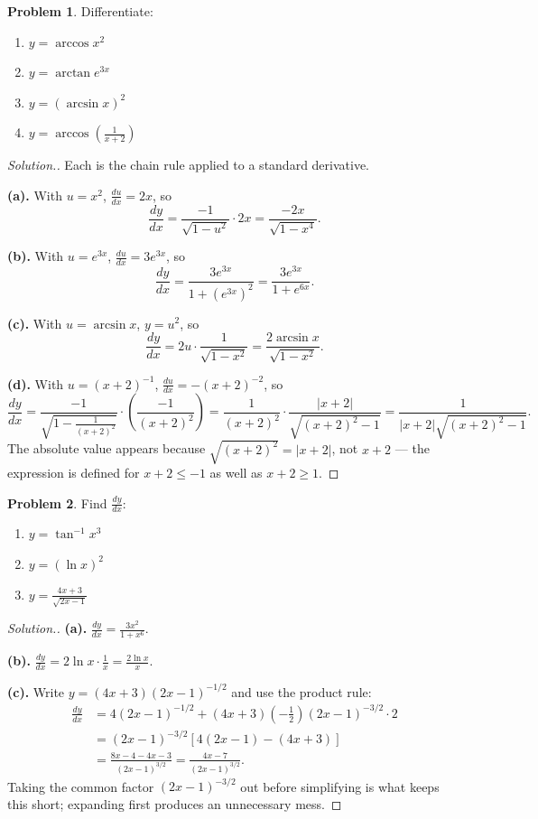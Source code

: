 \documentclass[11pt,a4paper]{article}
\theoremstyle{definition}
\newtheorem{problemx}{Problem}[section]
\newenvironment{problem}{\begin{problemx}}{\end{problemx}}
\newenvironment{solution}
  {\renewcommand{\qedsymbol}{}\begin{proof}[\textit{Solution}.]}
  {\end{proof}}
\begin{document}
\begin{problem}
Differentiate:
\begin{enumerate}
\item[(a).] $y=\arccos x^{2}$
\item[(b).] $y=\arctan e^{3x}$
\item[(c).] $y=(\arcsin x)^{2}$
\item[(d).] $y=\arccos\left(\frac{1}{x+2}\right)$
\end{enumerate}
\end{problem}

\begin{solution}
Each is the chain rule applied to a standard derivative.

\textbf{(a).} With $u=x^{2}$, $\frac{du}{dx}=2x$, so
$$\frac{dy}{dx}=\frac{-1}{\sqrt{1-u^{2}}}\cdot 2x
=\frac{-2x}{\sqrt{1-x^{4}}} .$$

\textbf{(b).} With $u=e^{3x}$, $\frac{du}{dx}=3e^{3x}$, so
$$\frac{dy}{dx}=\frac{3e^{3x}}{1+\left(e^{3x}\right)^{2}}
=\frac{3e^{3x}}{1+e^{6x}} .$$

\textbf{(c).} With $u=\arcsin x$, $y=u^{2}$, so
$$\frac{dy}{dx}=2u\cdot\frac{1}{\sqrt{1-x^{2}}}
=\frac{2\arcsin x}{\sqrt{1-x^{2}}} .$$

\textbf{(d).} With $u=(x+2)^{-1}$, $\frac{du}{dx}=-(x+2)^{-2}$, so
$$\frac{dy}{dx}=\frac{-1}{\sqrt{1-\frac{1}{(x+2)^{2}}}}\cdot
\left(\frac{-1}{(x+2)^{2}}\right)
=\frac{1}{(x+2)^{2}}\cdot\frac{\left|x+2\right|}{\sqrt{(x+2)^{2}-1}}
=\frac{1}{\left|x+2\right|\sqrt{(x+2)^{2}-1}} .$$
The absolute value appears because
$\sqrt{(x+2)^{2}}=\left|x+2\right|$, not $x+2$ --- the expression is defined for
$x+2\leq-1$ as well as $x+2\geq 1$.
\end{solution}

\begin{problem}
Find $\frac{dy}{dx}$:
\begin{enumerate}
\item[(a).] $y=\tan^{-1}x^{3}$
\item[(b).] $y=\left(\ln x\right)^{2}$
\item[(c).] $y=\frac{4x+3}{\sqrt{2x-1}}$
\end{enumerate}
\end{problem}

\begin{solution}
\textbf{(a).} $\frac{dy}{dx}=\frac{3x^{2}}{1+x^{6}}$.

\textbf{(b).} $\frac{dy}{dx}=2\ln x\cdot\frac{1}{x}=\frac{2\ln x}{x}$.

\textbf{(c).} Write $y=(4x+3)(2x-1)^{-1/2}$ and use the product rule:
\begin{align*}
\frac{dy}{dx} &=4(2x-1)^{-1/2}+(4x+3)\left(-\tfrac{1}{2}\right)(2x-1)^{-3/2}\cdot 2\\
               &=(2x-1)^{-3/2}\left[4(2x-1)-(4x+3)\right]\\
               &=\frac{8x-4-4x-3}{(2x-1)^{3/2}}
                =\frac{4x-7}{(2x-1)^{3/2}} .
\end{align*}
Taking the common factor $(2x-1)^{-3/2}$ out before simplifying is what keeps this
short; expanding first produces an unnecessary mess.
\end{solution}
\end{document}
